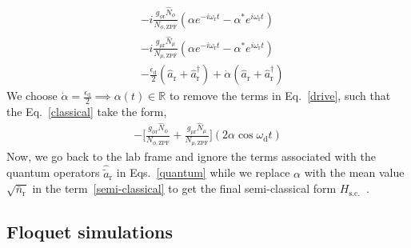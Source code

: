 \documentclass[%
reprint,
superscriptaddress,
 amsmath,amssymb,
 aps,
 prx,
longbibliography,
floatfix,
]{revtex4-2}
\begin{document}
{\begin{align}
   &-i\frac{g_{\phi\textrm{r}}\hat N_\phi}{N_{\phi,\textrm{ZPF}}}(\alpha e^{-i\omega_\textrm{r} t}-\alpha^* e^{i\omega_\textrm{r} t})\\&-i\frac{g_{\mu\textrm{r}}\hat N_\mu}{N_{\mu,\textrm{ZPF}}}(\alpha e^{-i\omega_\textrm{r} t}-\alpha^* e^{i\omega_\textrm{r} t})\label{classical}\\
   &-\frac{\epsilon_\textrm{d}}{2}(\hat a_\textrm{r}+\hat a_\textrm{r}^\dagger)+\dot{\alpha}(\hat a_\textrm{r}+\hat a_\textrm{r}^\dagger)\label{drive}
\end{align}
We choose $\dot{\alpha}=\frac{\epsilon_\textrm{d}}{2}\implies\alpha(t)\in\mathbb{R}$ to remove the terms in Eq.~\ref{drive}, such that the Eq.~\ref{classical} take the form,
\begin{align}
    -\Big[\frac{g_{\phi\textrm{r}}\hat N_\phi}{N_{\phi,\textrm{ZPF}}}+\frac{g_{\mu\textrm{r}}\hat N_\mu}{N_{\mu,\textrm{ZPF}}}\Big](2\alpha\cos{\omega_\textrm{d} t})\label{semi-classical}
\end{align}
Now, we go back to the lab frame and ignore the terms associated with the quantum operators $\hat{\tilde{a}}_\textrm{r}$ in Eqs.~\ref{quantum} while we replace $\alpha$ with the mean value $\sqrt{\bar n_\textrm{r}}$ in the term~\ref{semi-classical} to get the final semi-classical form $H_\textrm{s.c.}$~\cite{cohen2023reminiscence}.

\subsection{Floquet simulations}
}
\end{document}
